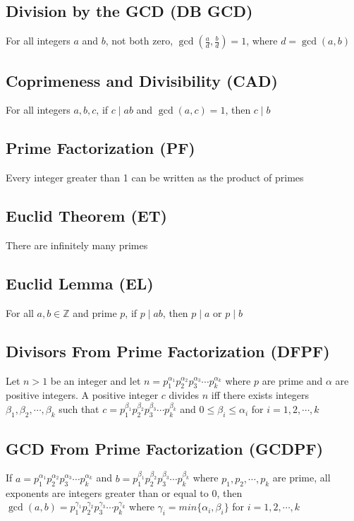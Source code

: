 \documentclass[12pt, letterpaper]{article}
\begin{document}
\subsection{Division by the GCD (DB GCD)}
For all integers $a$ and $b$, not both zero, $\gcd(\frac{a}{d}, \frac{b}{d}) = 1$, where $d = \gcd(a,b)$
\subsection{Coprimeness and Divisibility (CAD)}
For all integers $a, b, c$, if $c\mid ab$ and $\gcd(a,c) = 1$, then $c \mid b$
\subsection{Prime Factorization (PF)}
Every integer greater than 1 can be written as the product of primes 
\subsection{Euclid Theorem (ET)}
There are infinitely many primes 
\subsection{Euclid Lemma (EL)}
For all $a,b \in \mathbb{Z}$ and prime $p$, if $p\mid ab$, then $p\mid a$ or $p\mid b$
\subsection{Divisors From Prime Factorization (DFPF)}
Let $n > 1$ be an integer and let $n = p_1^{\alpha_1}p_2^{\alpha_2}p_3^{\alpha_3}\cdots p_k^{\alpha_k}$ where $p$ are prime and $\alpha$ are
positive integers. A positive integer $c$ divides $n$ iff there exists integers $\beta_1, \beta_2, \cdots, \beta_k$ such that 
$c = p_1^{\beta_1}p_2^{\beta_2}p_3^{\beta_3}\cdots p_k^{\beta_k}$ and $0 \leq \beta_i \leq \alpha_i$ for $i = 1, 2, \cdots, k$
\subsection{GCD From Prime Factorization (GCDPF)}
If $a = p_1^{\alpha_1}p_2^{\alpha_2}p_3^{\alpha_3}\cdots p_k^{\alpha_k}$ and $b = p_1^{\beta_1}p_2^{\beta_2}p_3^{\beta_3}\cdots p_k^{\beta_k}$
where $p_1, p_2, \cdots, p_k$ are prime, all exponents are integers greater than or equal to $0$, then 
$\gcd(a,b) = p_1^{\gamma_1}p_2^{\gamma_2}p_3^{\gamma_3}\cdots p_k^{\gamma_k}$ where $\gamma_i = min\{\alpha_i, \beta_i\}$ for $i = 1, 2, \cdots, k$
\end{document}
